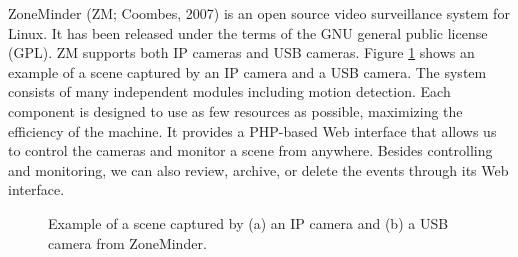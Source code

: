 ZoneMinder (ZM; Coombes, 2007)\nocite{zoneminder} is an open source
video surveillance system for Linux. It has been released under the
terms of the GNU general public license (GPL). ZM supports both IP
cameras and USB cameras. Figure \ref{fig:zm-webcam} shows an example
of a scene captured by an IP camera and a USB camera. The system
consists of many independent modules including motion detection.  Each
component is designed to use as few resources as possible, maximizing
the efficiency of the machine. It provides a PHP-based Web interface
that allows us to control the cameras and monitor a scene from
anywhere. Besides controlling and monitoring, we can also review,
archive, or delete the events through its Web interface.

\begin{figure}[t]
  \begin{center}
    \hspace{0.1in}
  \end{center}
  \caption[Example of a scene captured by ZoneMinder.]{\small Example
    of a scene captured by (a) an IP camera and (b) a USB camera from
    ZoneMinder.}
  \label{fig:zm-webcam}
\end{figure}

